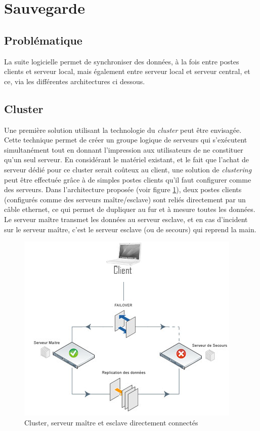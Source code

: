 \section{Sauvegarde}\label{SauvegardeTechnique}
\label{Architecture_technique_de_sauvegarde}

\subsection{Problématique}
La suite logicielle permet de synchroniser des données, à la fois entre postes clients et serveur local, mais également entre serveur local et serveur central, et ce, via les différentes architectures ci dessous.

\subsection{Cluster}
Une première solution utilisant la technologie du \emph{cluster} peut être envisagée.
Cette technique permet de créer un groupe logique de serveurs qui s'exécutent simultanément tout en donnant l'impression aux utilisateurs de ne constituer qu'un seul serveur.
En considérant le matériel existant, et le fait que l'achat de serveur dédié pour ce cluster serait coûteux au client, une solution de \emph{clustering} peut être effectuée grâce à de simples postes clients qu'il faut configurer comme des serveurs.
Dans l'architecture proposée (voir figure \ref{SchemaCluster}), deux postes clients (configurés comme des serveurs maître/esclave) sont reliés directement par un câble ethernet, ce qui permet de dupliquer au fur et à mesure toutes les données.
Le serveur maître transmet les données au serveur esclave, et en cas d'incident sur le serveur maître, c'est le serveur esclave (ou de secours) qui reprend la main.

\begin{figure}[htbp]
	\centering
	\includegraphics[scale=0.9]{Images/SchemaCluster.png}
	\caption{Cluster, serveur maître et esclave directement connectés}
	\label{SchemaCluster}
\end{figure}

